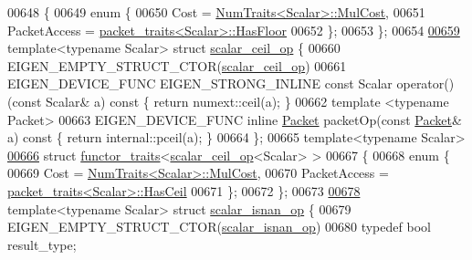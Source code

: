 \begin{DoxyCode}
00648 \{
00649   \textcolor{keyword}{enum} \{
00650     Cost = \hyperlink{group___core___module_struct_eigen_1_1_num_traits}{NumTraits<Scalar>::MulCost},
00651     PacketAccess = \hyperlink{struct_eigen_1_1internal_1_1packet__traits}{packet\_traits<Scalar>::HasFloor}
00652   \};
00653 \};
00654 
\hyperlink{struct_eigen_1_1internal_1_1scalar__ceil__op}{00659} \textcolor{keyword}{template}<\textcolor{keyword}{typename} Scalar> \textcolor{keyword}{struct }\hyperlink{struct_eigen_1_1internal_1_1scalar__ceil__op}{scalar\_ceil\_op} \{
00660   EIGEN\_EMPTY\_STRUCT\_CTOR(\hyperlink{struct_eigen_1_1internal_1_1scalar__ceil__op}{scalar\_ceil\_op})
00661   EIGEN\_DEVICE\_FUNC EIGEN\_STRONG\_INLINE \textcolor{keyword}{const} Scalar operator() (\textcolor{keyword}{const} Scalar& a)\textcolor{keyword}{ const }\{ \textcolor{keywordflow}{return} 
      numext::ceil(a); \}
00662   \textcolor{keyword}{template} <\textcolor{keyword}{typename} Packet>
00663   EIGEN\_DEVICE\_FUNC \textcolor{keyword}{inline} \hyperlink{union_eigen_1_1internal_1_1_packet}{Packet} packetOp(\textcolor{keyword}{const} \hyperlink{union_eigen_1_1internal_1_1_packet}{Packet}& a)\textcolor{keyword}{ const }\{ \textcolor{keywordflow}{return} internal::pceil(a); 
      \}
00664 \};
00665 \textcolor{keyword}{template}<\textcolor{keyword}{typename} Scalar>
\hyperlink{struct_eigen_1_1internal_1_1functor__traits_3_01scalar__ceil__op_3_01_scalar_01_4_01_4}{00666} \textcolor{keyword}{struct }\hyperlink{struct_eigen_1_1internal_1_1functor__traits}{functor\_traits}<\hyperlink{struct_eigen_1_1internal_1_1scalar__ceil__op}{scalar\_ceil\_op}<Scalar> >
00667 \{
00668   \textcolor{keyword}{enum} \{
00669     Cost = \hyperlink{group___core___module_struct_eigen_1_1_num_traits}{NumTraits<Scalar>::MulCost},
00670     PacketAccess = \hyperlink{struct_eigen_1_1internal_1_1packet__traits}{packet\_traits<Scalar>::HasCeil}
00671   \};
00672 \};
00673 
\hyperlink{struct_eigen_1_1internal_1_1scalar__isnan__op}{00678} \textcolor{keyword}{template}<\textcolor{keyword}{typename} Scalar> \textcolor{keyword}{struct }\hyperlink{struct_eigen_1_1internal_1_1scalar__isnan__op}{scalar\_isnan\_op} \{
00679   EIGEN\_EMPTY\_STRUCT\_CTOR(\hyperlink{struct_eigen_1_1internal_1_1scalar__isnan__op}{scalar\_isnan\_op})
00680   \textcolor{keyword}{typedef} \textcolor{keywordtype}{bool} result\_type;

\end{DoxyCode}
